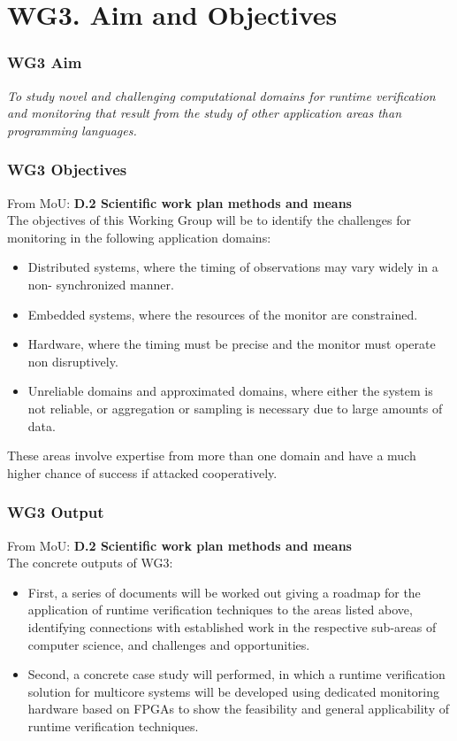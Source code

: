 \documentclass{beamer}
\begin{document}
\section{WG3. Aim and Objectives}

\begin{frame} 
  \frametitle{WG3 Aim}
  \Large
  
  \textit{To study novel and challenging computational domains for
    runtime verification and monitoring that result from the study of
    other application areas than programming languages.}
\end{frame}

\begin{frame} 
  \frametitle{WG3 Objectives}
  
  From MoU: \textbf{D.2 Scientific work plan methods and means} \\[2em]
  
  The objectives of this Working Group will be to identify the
  challenges for monitoring in the following application domains:
  \begin{itemize}
  \item \alert{Distributed systems}, where the timing of observations may vary
    widely in a non- synchronized manner.
  \item \alert{Embedded systems}, where the resources of the monitor
    are constrained.
  \item \alert{Hardware}, where the timing must be precise and the
    monitor must operate non disruptively.
  \item \alert{Unreliable} domains and \alert{approximated} domains,
    where either the system is not reliable, or aggregation or
    sampling is necessary due to large amounts of data.  
  \end{itemize}
  These areas involve expertise from more than one domain and have a
  much higher chance of success if attacked cooperatively.
\end{frame}

\begin{frame}
  \frametitle{WG3 Output}
  From MoU: \textbf{D.2 Scientific work plan methods and means}\\[2em]

  The \alert{concrete outputs} of WG3:
  \begin{itemize}
  \item First, a series of documents will be worked out giving a
    \alert{roadmap} for the application of runtime verification techniques to
    the areas listed above, identifying connections with established
    work in the respective sub-areas of computer science, and
    challenges and opportunities. 
  \item Second, a \alert{concrete case study} will performed, in which
    a runtime verification solution for multicore systems will be
    developed using dedicated monitoring hardware based on FPGAs to
    show the feasibility and general applicability of runtime
    verification techniques.
  \end{itemize}
\end{frame}
\end{document}
